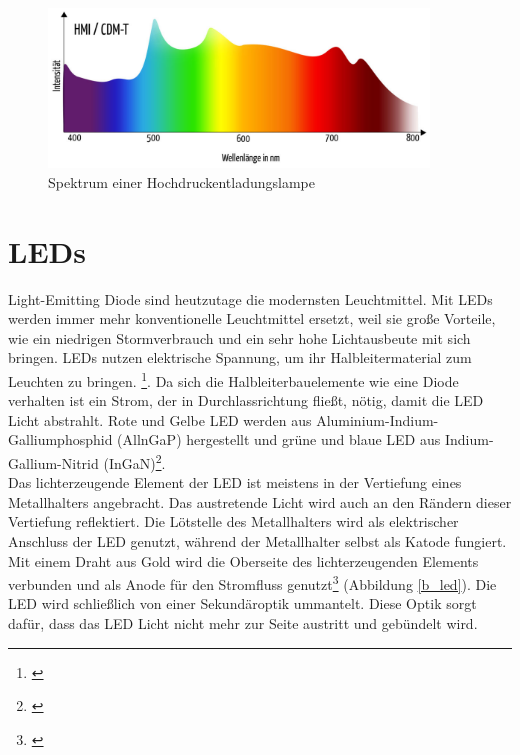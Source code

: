 \begin{figure}[H]     %
\centering
\includegraphics[width=0.9\textwidth]{bilder/hmi} 
\caption {Spektrum einer Hochdruckentladungslampe\protect\footnotemark}\label{b_halogen}
\end{figure}

\section{LEDs} \label{sec_led}
Light-Emitting Diode sind heutzutage die modernsten Leuchtmittel. Mit LEDs werden immer mehr konventionelle Leuchtmittel ersetzt, weil sie große Vorteile, wie ein niedrigen Stormverbrauch und ein sehr hohe Lichtausbeute mit sich bringen. LEDs nutzen elektrische Spannung, um ihr  Halbleitermaterial zum Leuchten zu bringen. \footnote{\cite[150]{mueller}}. Da sich die Halbleiterbauelemente wie eine Diode verhalten ist ein Strom, der in Durchlassrichtung fließt, nötig, damit die LED Licht abstrahlt. Rote und Gelbe LED werden aus Aluminium-Indium-Galliumphosphid (AllnGaP) hergestellt und grüne und blaue LED aus Indium-Gallium-Nitrid (InGaN)\footnote{\cite[153]{ris}}.\\
Das lichterzeugende Element der LED ist meistens in der Vertiefung eines Metallhalters angebracht. Das austretende Licht wird auch an den Rändern dieser Vertiefung reflektiert. Die Lötstelle des Metallhalters wird als elektrischer Anschluss der LED genutzt, während der Metallhalter selbst als Katode fungiert. Mit einem Draht aus Gold wird die Oberseite des lichterzeugenden Elements verbunden und als Anode für den Stromfluss genutzt\footnote{\cite[154]{ris}} (Abbildung \ref{b_led}). Die LED wird schließlich von einer Sekundäroptik ummantelt. Diese Optik sorgt dafür, dass das LED Licht nicht mehr zur Seite austritt und gebündelt wird.


